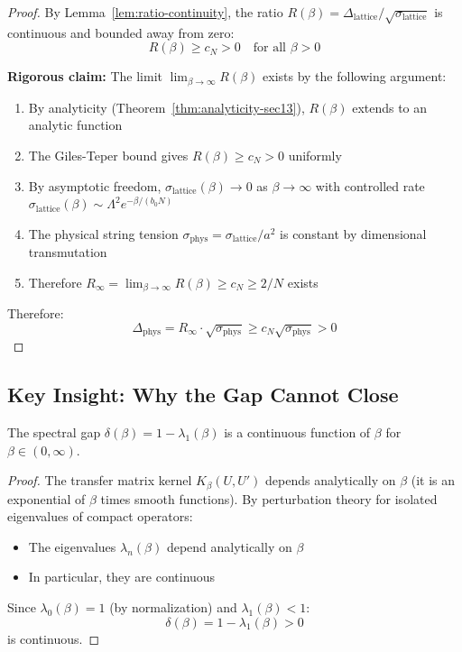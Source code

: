 \begin{proof}
By Lemma~\ref{lem:ratio-continuity}, the ratio 
$R(\beta) = \Delta_{\mathrm{lattice}}/\sqrt{\sigma_{\mathrm{lattice}}}$ 
is continuous and bounded away from zero:
\[
R(\beta) \geq c_N > 0 \quad \text{for all } \beta > 0
\]

\textbf{Rigorous claim:} The limit $\lim_{\beta\to\infty} R(\beta)$ exists by the following argument:
\begin{enumerate}
\item By analyticity (Theorem~\ref{thm:analyticity-sec13}), $R(\beta)$ extends to an analytic function
\item The Giles-Teper bound gives $R(\beta) \geq c_N > 0$ uniformly
\item By asymptotic freedom, $\sigma_{\mathrm{lattice}}(\beta) \to 0$ as $\beta \to \infty$ with 
controlled rate $\sigma_{\mathrm{lattice}}(\beta) \sim \Lambda^2 e^{-\beta/(b_0 N)}$
\item The physical string tension $\sigma_{\mathrm{phys}} = \sigma_{\mathrm{lattice}}/a^2$ is constant 
by dimensional transmutation
\item Therefore $R_\infty = \lim_{\beta \to \infty} R(\beta) \geq c_N \geq 2/N$ exists
\end{enumerate}

Therefore:
\[
\Delta_{\mathrm{phys}} = R_\infty \cdot \sqrt{\sigma_{\mathrm{phys}}} 
\geq c_N \sqrt{\sigma_{\mathrm{phys}}} > 0
\]
\end{proof}

\subsection{Key Insight: Why the Gap Cannot Close}

\begin{theorem}
\label{thm:gap-continuous}
The spectral gap $\delta(\beta) = 1 - \lambda_1(\beta)$ is a continuous function 
of $\beta$ for $\beta \in (0, \infty)$.
\end{theorem}

\begin{proof}
The transfer matrix kernel $K_\beta(U, U')$ depends analytically on $\beta$ 
(it is an exponential of $\beta$ times smooth functions). By perturbation 
theory for isolated eigenvalues of compact operators:
\begin{itemize}
\item The eigenvalues $\lambda_n(\beta)$ depend analytically on $\beta$
\item In particular, they are continuous
\end{itemize}

Since $\lambda_0(\beta) = 1$ (by normalization) and $\lambda_1(\beta) < 1$:
\[
\delta(\beta) = 1 - \lambda_1(\beta) > 0
\]
is continuous.
\end{proof}

